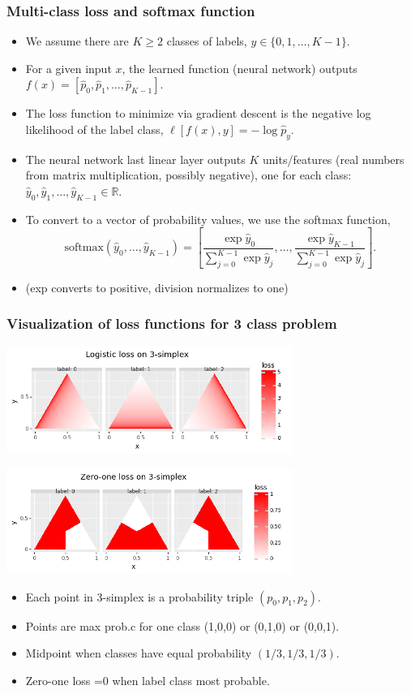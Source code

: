 \documentclass{beamer}
\begin{document}
\begin{frame}
  \frametitle{Multi-class loss and softmax function}

  \begin{itemize}
  \item We assume there are $K\geq 2$ classes of labels,
    $y\in\{0,1, \dots, K-1\}$.
  \item For a given input $x$, the learned function (neural network)
    outputs $f(x) = [\hat p_0,\hat p_1,\dots,\hat p_{K-1}]$.
  \item The loss function to minimize via gradient descent is the
    negative log likelihood of the label class, $\ell[f(x),y] = -\log \hat p_y.$
  \item The neural network last linear layer outputs $K$
    units/features (real numbers from matrix multiplication, possibly
    negative), one for each class:
    $\hat y_0,\hat y_1,\dots, \hat y_{K-1}\in\mathbb R$.
  \item To convert to a vector of probability values, we use the
    softmax function, 
$$ \text{softmax}(\hat y_0, \dots, \hat y_{K-1}) = 
\left[ \frac{\exp\hat y_0}{\sum_{j=0}^{K-1} \exp\hat y_j}, \dots,
\frac{\exp\hat y_{K-1}}{\sum_{j=0}^{K-1} \exp\hat y_j}\right].
$$
\item (exp converts to positive, division normalizes to one)
  \end{itemize}
\end{frame}

\begin{frame}
  \frametitle{Visualization of loss functions for 3 class problem}
  
  \includegraphics[width=0.7\textwidth]{2022-02-15-simplex-multi-logistic}

  \includegraphics[width=0.7\textwidth]{2022-02-15-simplex-multi-zero-one}

  \begin{itemize}
  \item Each point in 3-simplex is a probability triple
    $(p_0,p_1,p_2)$.
  \item Points are max prob.c for one class (1,0,0)
    or (0,1,0) or (0,0,1).
  \item Midpoint when classes have equal probability
    $(1/3, 1/3, 1/3)$.
  \item Zero-one loss =0 when label class most probable.
  \end{itemize}
\end{frame}
\end{document}
